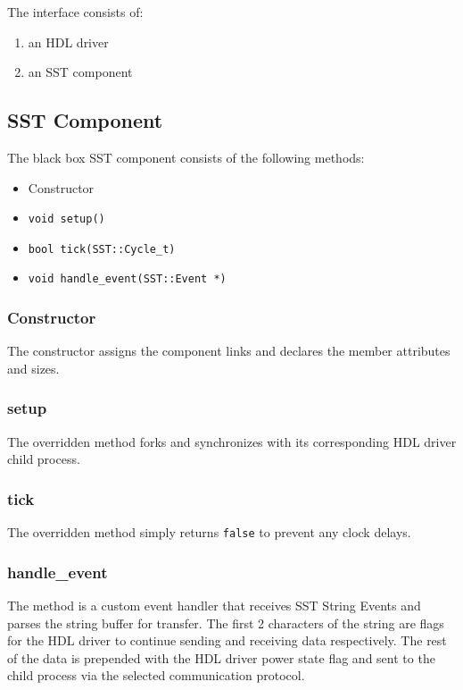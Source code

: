 \documentclass{article}
\begin{document}
  The interface consists of:
  \begin{enumerate}
    \item an HDL driver
    \item an SST component
  \end{enumerate}

    \subsection{SST Component}
    The black box SST component consists of the following methods:
    \begin{itemize}
      \item Constructor
      \item \texttt{void setup()}
      \item \texttt{bool tick(SST::Cycle\_t)}
      \item \texttt{void handle\_event(SST::Event *)}
    \end{itemize}

      \subsubsection{Constructor}
      The constructor assigns the component links and declares the member attributes and sizes.

      \subsubsection{setup}
      The overridden method forks and synchronizes with its corresponding HDL driver child process.

      \subsubsection{tick}
      The overridden method simply returns \texttt{false} to prevent any clock delays.

      \subsubsection{handle\_event}
      The method is a custom event handler that receives SST String Events and parses the string
      buffer for transfer. The first 2 characters of the string are flags for the HDL driver to
      continue sending and receiving data respectively. The rest of the data is prepended with the
      HDL driver power state flag and sent to the child process via the selected communication
      protocol.
\end{document}

